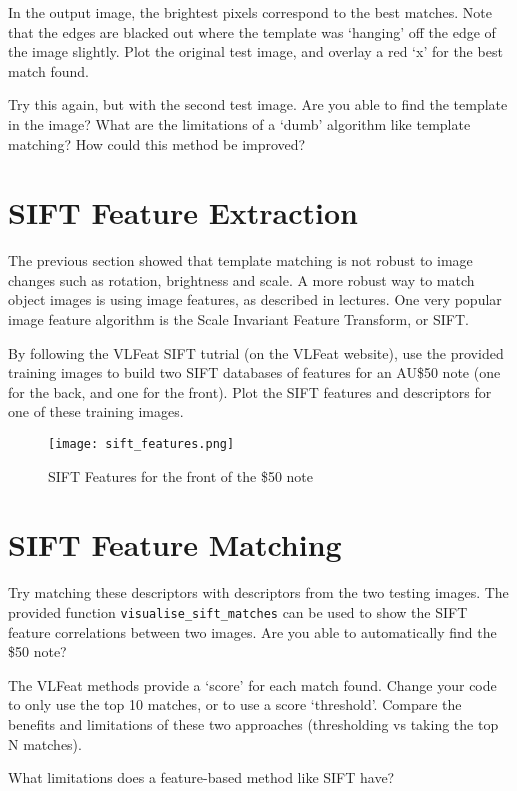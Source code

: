 \documentclass{article}
\newcommand{\inlinecodez}[1]{\colorbox{codegray}{\texttt{\small#1}}}
\begin{document}
In the output image, the brightest pixels correspond to the best matches.
Note that the edges are blacked out where the template was `hanging' off the edge of the image slightly.
Plot the original test image, and overlay a red `x' for the best match found.

Try this again, but with the second test image.
Are you able to find the template in the image?
What are the limitations of a `dumb' algorithm like template matching? How could this method be improved?

\section{SIFT Feature Extraction}

The previous section showed that template matching is not robust to image changes such as rotation, brightness and scale.
A more robust way to match object images is using image features, as described in lectures.
One very popular image feature algorithm is the Scale Invariant Feature Transform, or SIFT.

By following the VLFeat SIFT tutrial (on the VLFeat website), use the provided training images to build two SIFT databases of features for an AU\$50 note (one for the back, and one for the front).
Plot the SIFT features and descriptors for one of these training images.

\begin{figure}[H]
	\begin{center}
		\texttt{[image: sift\_features.png]}
		\caption{SIFT Features for the front of the \$50 note}
	\end{center}
\end{figure}

\section{SIFT Feature Matching}

Try matching these descriptors with descriptors from the two testing images. The provided function \inlinecodez{visualise\_sift\_matches} can be used to show the SIFT feature correlations between two images.
Are you able to automatically find the \$50 note?

The VLFeat methods provide a `score' for each match found.
Change your code to only use the top 10 matches, or to use a score `threshold'.
Compare the benefits and limitations of these two approaches (thresholding vs taking the top N matches).

What limitations does a feature-based method like SIFT have?
\end{document}
